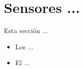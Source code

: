 \section{Sensores ...}
\begin{adjustwidth}{2.4em}{0em}
	Esta sección ...
	\begin{itemize}[noitemsep]
		\item Los ...
		\item El ...
	\end{itemize}	
\end{adjustwidth}
